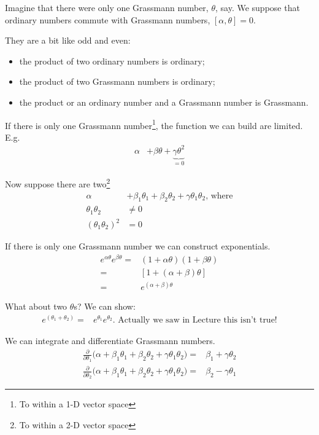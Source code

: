 \documentclass[]{article}
\begin{document}
Imagine that there were only one Grassmann number, $\theta$, say. We suppose that ordinary numbers commute with Grassmann numbers, $[\alpha,\theta]=0$.

They are a bit like odd and even:
\begin{itemize}
	\item the product of two ordinary numbers is ordinary;
	\item the product of two Grassmann numbers is ordinary;
	\item the product or an ordinary number and a Grassmann number is Grassmann.
\end{itemize}

If there is only one Grassmann number\footnote{To within a 1-D vector space}, the function we can build are limited. E.g.
\begin{align*}
	\alpha& + \beta \theta + \underbrace{\gamma \theta^2}_\text{$=0$} 
\end{align*}

Now suppose there are two\footnote{To within a 2-D vector space}
\begin{align*}
	\alpha& + \beta_1 \theta_1 + \beta_2 \theta_2 + \gamma \theta_1 \theta_2 \text{, where}\\
	\theta_1 \theta_2& \ne 0\\
	(\theta_1 \theta_2)^2& = 0
\end{align*}

If there is only one Grassmann number we can construct exponentials.
\begin{align*}
	e^{\alpha \theta} 	e^{\beta \theta} =& (1+\alpha \theta)(1+\beta \theta)\\
	=& [1+(\alpha + \beta) \theta]\\
	=& e^{(\alpha + \beta) \theta} 
\end{align*}

What about two $\theta$s? We can show:
\begin{align*}
	e^{(\theta_1 + \theta_2)} =& e^{\theta_1}  e^{\theta_2} \text{. Actually we saw in Lecture this isn't true!}
\end{align*}

We can integrate and differentiate Grassmann numbers.
\begin{align*}
	\frac{\partial}{\partial \theta_1} \big(\alpha + \beta_1 \theta_1 + \beta_2 \theta_2 + \gamma \theta_1 \theta_2 \big) =& \beta_1 + \gamma \theta_2\\
	\frac{\partial}{\partial \theta_2} \big(\alpha + \beta_1 \theta_1 + \beta_2 \theta_2 + \gamma \theta_1 \theta_2 \big) =& \beta_2 - \gamma \theta_1
\end{align*}
\end{document}
